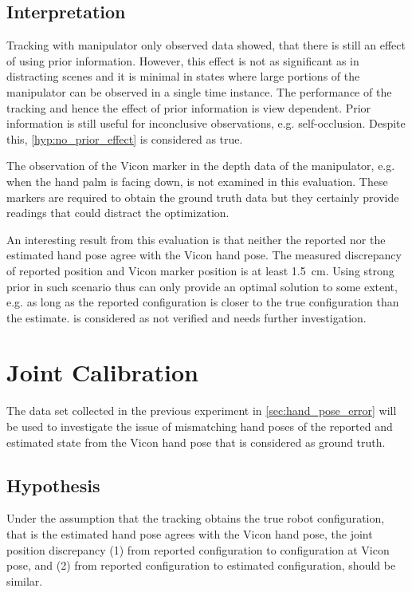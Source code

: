 \subsection{Interpretation}

Tracking with manipulator only observed data showed, that there is still an effect of using prior information. However, this effect is not as significant as in distracting scenes and it is minimal in states where large portions of the manipulator can be observed in a single time instance. The performance of the tracking and hence the effect of prior information is view dependent. Prior information is still useful for inconclusive observations, e.g. self-occlusion. Despite this, \cref{hyp:no_prior_effect} is considered as true.

The observation of the Vicon marker in the depth data of the manipulator, e.g. when the hand palm is facing down, is not examined in this evaluation. These markers are required to obtain the ground truth data but they certainly provide  readings that could distract the optimization.

An interesting result from this evaluation is that neither the reported nor the estimated hand pose agree with the Vicon hand pose. The measured discrepancy of reported position and Vicon marker position is at least \SI{1.5}{\cm}. Using strong prior in such scenario thus can only provide an optimal solution to some extent, e.g. as long as the reported configuration is closer to the true configuration than the estimate.  is considered as not verified and needs further investigation.


\section{Joint Calibration}

The data set collected in the previous experiment in \cref{sec:hand_pose_error} will be used to investigate the issue of mismatching hand poses of the reported and estimated state from the Vicon hand pose that is considered as ground truth.

\subsection{Hypothesis}

Under the assumption that the tracking obtains the true robot configuration, that is the estimated hand pose agrees with the Vicon hand pose, the joint position discrepancy (1) from reported configuration to configuration at Vicon pose, and (2) from reported configuration to estimated configuration, should be similar.

